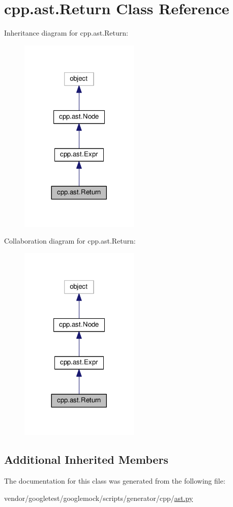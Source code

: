 \hypertarget{classcpp_1_1ast_1_1Return}{}\section{cpp.\+ast.\+Return Class Reference}
\label{classcpp_1_1ast_1_1Return}


Inheritance diagram for cpp.\+ast.\+Return\+:
\nopagebreak
\begin{figure}[H]
\begin{center}
\leavevmode
\includegraphics[width=161pt]{classcpp_1_1ast_1_1Return__inherit__graph}
\end{center}
\end{figure}


Collaboration diagram for cpp.\+ast.\+Return\+:
\nopagebreak
\begin{figure}[H]
\begin{center}
\leavevmode
\includegraphics[width=161pt]{classcpp_1_1ast_1_1Return__coll__graph}
\end{center}
\end{figure}
\subsection*{Additional Inherited Members}


The documentation for this class was generated from the following file\+:\begin{DoxyCompactItemize}
\item 
vendor/googletest/googlemock/scripts/generator/cpp/\hyperlink{ast_8py}{ast.\+py}\end{DoxyCompactItemize}
